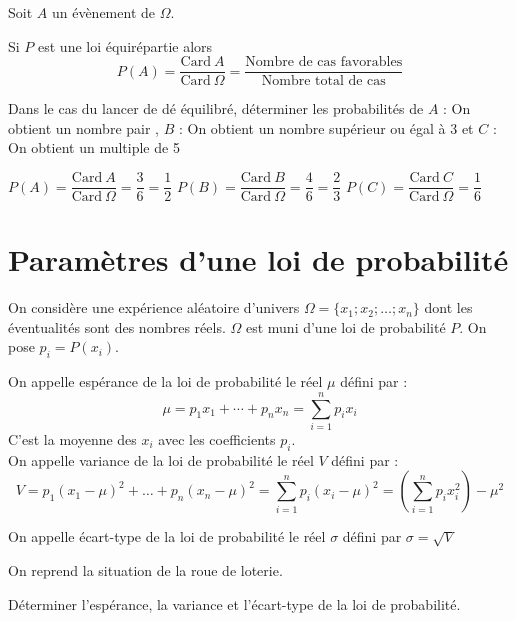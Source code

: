 \documentclass[french]{book}
\begin{document}
\vspace{1ex}
Soit $A$ un \'ev\`enement de $\Omega$.

\begin{prop}
Si $P$ est une loi \'equir\'epartie alors 
\[P(A)=\dfrac{\text{Card}\ A}{\text{Card}\ \Omega}=\dfrac{\text{Nombre de cas favorables}}{\text{Nombre total de cas}}\]
\end{prop}

\begin{exemple}
Dans le cas du lancer de d\'e \'equilibr\'e, d\'eterminer les probabilit\'es de $A$ : \og On obtient un nombre pair \fg, $B$ : \og On obtient un nombre sup\'erieur ou \'egal à 3 \fg{} et $C$ : \og On obtient un multiple de 5 \fg
\end{exemple}


$P(A)=\dfrac{\text{Card}\ A}{\text{Card}\ \Omega}=\dfrac{3}{6}=\dfrac{1}{2}$
\hfill
$P(B)=\dfrac{\text{Card}\ B}{\text{Card}\ \Omega}=\dfrac{4}{6}=\dfrac{2}{3}$
\hfill
$P(C)=\dfrac{\text{Card}\ C}{\text{Card}\ \Omega}=\dfrac{1}{6}$


\section{Param\`etres d'une loi de probabilit\'e}
On consid\`ere une exp\'erience al\'eatoire d'univers $\Omega=\{x_1;x_2;\ldots;x_n\}$ dont les \'eventualit\'es sont des nombres r\'eels. $\Omega$ est muni d'une loi de probabilit\'e $P$. On pose $p_i=P(x_i)$.

\begin{defn}
On appelle esp\'erance de la loi de probabilit\'e le r\'eel $\mu$ d\'efini par :
\[\mu=p_1x_1+\cdots+p_n x_n=\sum_{i=1}^n p_ix_i\]
C'est la moyenne des $x_i$ avec les coefficients $p_i$.\\

On appelle variance de la loi de probabilit\'e le r\'eel $V$ d\'efini par :
\[V= p_1(x_1-\mu)^2+\dots+p_n(x_n-\mu)^2=\sum_{i=1}^np_i(x_i-\mu)^2=\left( \sum_{i=1}^np_ix_i^2\right)-\mu^2\]

On appelle \'ecart-type de la loi de probabilit\'e le r\'eel $\sigma$ d\'efini par $\sigma=\sqrt{V}$
\end{defn}

\begin{exemple}
On reprend la situation de la roue de loterie.

D\'eterminer l'esp\'erance, la variance et l'\'ecart-type de la loi de probabilit\'e.
\end{exemple}
\end{document}
